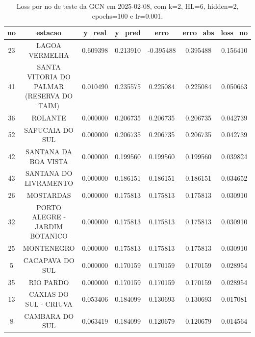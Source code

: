\begin{table}[h]
\centering
\caption{Loss por no de teste da GCN em 2025-02-08, com k=2, HL=6, hidden=2, epochs=100 e lr=0.001.}
\label{tab:gcn_loss_k2_hl6_h2_e100_d20250208}
\begin{tabular}{ccccccc}
\toprule
no & estacao & y\_real & y\_pred & erro & erro\_abs & loss\_no \\
\midrule
23 & LAGOA VERMELHA & 0.609398 & 0.213910 & -0.395488 & 0.395488 & 0.156410 \\
41 & SANTA VITORIA DO PALMAR (RESERVA DO TAIM) & 0.010490 & 0.235575 & 0.225084 & 0.225084 & 0.050663 \\
36 & ROLANTE & 0.000000 & 0.206735 & 0.206735 & 0.206735 & 0.042739 \\
52 & SAPUCAIA DO SUL & 0.000000 & 0.206735 & 0.206735 & 0.206735 & 0.042739 \\
42 & SANTANA DA BOA VISTA & 0.000000 & 0.199560 & 0.199560 & 0.199560 & 0.039824 \\
43 & SANTANA DO LIVRAMENTO & 0.000000 & 0.186151 & 0.186151 & 0.186151 & 0.034652 \\
26 & MOSTARDAS & 0.000000 & 0.175813 & 0.175813 & 0.175813 & 0.030910 \\
32 & PORTO ALEGRE - JARDIM BOTANICO & 0.000000 & 0.175813 & 0.175813 & 0.175813 & 0.030910 \\
25 & MONTENEGRO & 0.000000 & 0.175813 & 0.175813 & 0.175813 & 0.030910 \\
5 & CACAPAVA DO SUL & 0.000000 & 0.170159 & 0.170159 & 0.170159 & 0.028954 \\
35 & RIO PARDO & 0.000000 & 0.170159 & 0.170159 & 0.170159 & 0.028954 \\
13 & CAXIAS DO SUL - CRIUVA & 0.053406 & 0.184099 & 0.130693 & 0.130693 & 0.017081 \\
8 & CAMBARA DO SUL & 0.063419 & 0.184099 & 0.120679 & 0.120679 & 0.014564 \\
\bottomrule
\end{tabular}
\end{table}
